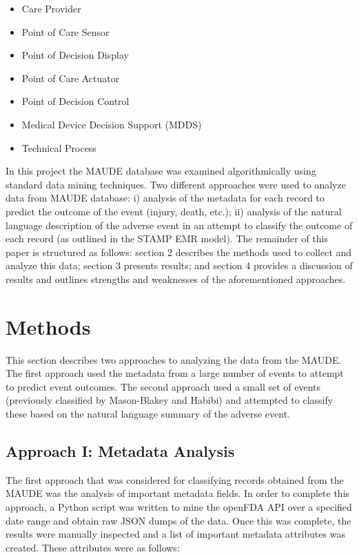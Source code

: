 \documentclass[11pt, notitlepage,abstracton,oneside]{article}   	%
\begin{document}
\begin{itemize}
	\item Care Provider
	\item Point of Care Sensor
	\item Point of Decision Display
	\item Point of Care Actuator
	\item Point of Decision Control
	\item Medical Device Decision Support (MDDS)
	\item Technical Process
\end{itemize}

In this project the MAUDE database was examined algorithmically using standard data mining techniques. Two different approaches were used to analyze data from MAUDE database:  i) analysis of the metadata for each record to predict the outcome of the event (injury, death, etc.); ii) analysis of the natural language description of the adverse event in an attempt to classify the outcome of each record (as outlined in the STAMP EMR model). The remainder of this paper is structured as follows: section 2 describes the methods used to collect and analyze this data; section 3 presents results; and section 4 provides a discussion of results and outlines strengths and weaknesses of the aforementioned approaches. 

\section{Methods}
This section describes two approaches to analyzing the data from the MAUDE. The first approach used the metadata from a large number of events to attempt to predict event outcomes. The second approach used a small set of events (previously classified by Mason-Blakey and Habibi) and attempted to classify these based on the natural language summary of the adverse event. 

\subsection{Approach I: Metadata Analysis}
The first approach that was considered for classifying records obtained from the MAUDE was the analysis of important metadata fields. In order to complete this approach, a Python script was written to mine the openFDA API over a specified date range and obtain raw JSON dumps of the data. Once this was complete, the results were manually inspected and a list of important metadata attributes was created. These attributes were as follows:
\end{document}
